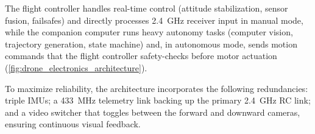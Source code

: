 %

The flight controller handles real-time control (attitude stabilization,
sensor fusion, failsafes) and directly processes \qty{2.4}{\giga\hertz}
receiver input in manual mode, while the companion computer runs heavy
autonomy tasks (computer vision, trajectory generation, state machine) and,
in autonomous mode, sends motion commands that the flight controller
safety-checks before motor actuation
(\autoref{fig:drone_electronics_architecture}).

To maximize reliability, the architecture incorporates the following
redundancies: triple IMUs; a
\qty{433}{\mega\hertz} telemetry link backing up the primary
\qty{2.4}{\giga\hertz} RC link; and a video switcher that toggles
between the forward and downward cameras, ensuring continuous visual
feedback.
